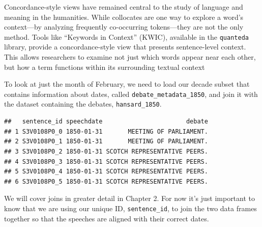 \documentclass[
]{article}
\begin{document}
Concordance-style views have remained central to the study of language
and meaning in the humanities. While collocates are one way to explore a
word's context---by analyzing frequently co-occurring tokens---they are
not the only method. Tools like ``Keywords in Context'' (KWIC),
available in the \texttt{quanteda} library, provide a concordance-style
view that presents sentence-level context. This allows researchers to
examine not just which words appear near each other, but how a term
functions within its surrounding textual context

To look at just the month of February, we need to load our decade subset
that contains information about dates, called
\texttt{debate\_metadata\_1850}, and join it with the dataset containing
the debates, \texttt{hansard\_1850}.

\begin{verbatim}
##   sentence_id speechdate                       debate
## 1 S3V0108P0_0 1850-01-31       MEETING OF PARLIAMENT.
## 2 S3V0108P0_1 1850-01-31       MEETING OF PARLIAMENT.
## 3 S3V0108P0_2 1850-01-31 SCOTCH REPRESENTATIVE PEERS.
## 4 S3V0108P0_3 1850-01-31 SCOTCH REPRESENTATIVE PEERS.
## 5 S3V0108P0_4 1850-01-31 SCOTCH REPRESENTATIVE PEERS.
## 6 S3V0108P0_5 1850-01-31 SCOTCH REPRESENTATIVE PEERS.
\end{verbatim}

We will cover joins in greater detail in Chapter 2. For now it's just
important to know that we are using our unique ID,
\texttt{sentence\_id}, to join the two data frames together so that the
speeches are aligned with their correct dates.
\end{document}
